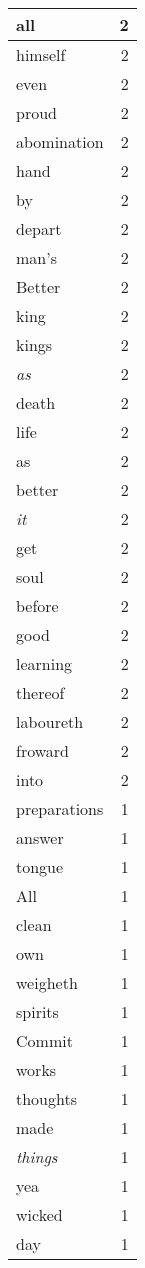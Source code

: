 \begin{center}
\begin{longtable}{l|r}
all & 2\\ \hline 
himself & 2\\ \hline 
even & 2\\ \hline 
proud & 2\\ \hline 
abomination & 2\\ \hline 
hand & 2\\ \hline 
by & 2\\ \hline 
depart & 2\\ \hline 
man's & 2\\ \hline 
Better & 2\\ \hline 
king & 2\\ \hline 
kings & 2\\ \hline 
\emph{as} & 2\\ \hline 
death & 2\\ \hline 
life & 2\\ \hline 
as & 2\\ \hline 
better & 2\\ \hline 
\emph{it} & 2\\ \hline 
get & 2\\ \hline 
soul & 2\\ \hline 
before & 2\\ \hline 
good & 2\\ \hline 
learning & 2\\ \hline 
thereof & 2\\ \hline 
laboureth & 2\\ \hline 
froward & 2\\ \hline 
into & 2\\ \hline 
preparations & 1\\ \hline 
answer & 1\\ \hline 
tongue & 1\\ \hline 
All & 1\\ \hline 
clean & 1\\ \hline 
own & 1\\ \hline 
weigheth & 1\\ \hline 
spirits & 1\\ \hline 
Commit & 1\\ \hline 
works & 1\\ \hline 
thoughts & 1\\ \hline 
made & 1\\ \hline 
\emph{things} & 1\\ \hline 
yea & 1\\ \hline 
wicked & 1\\ \hline 
day & 1\\ \hline 

\end{longtable}
\end{center}
